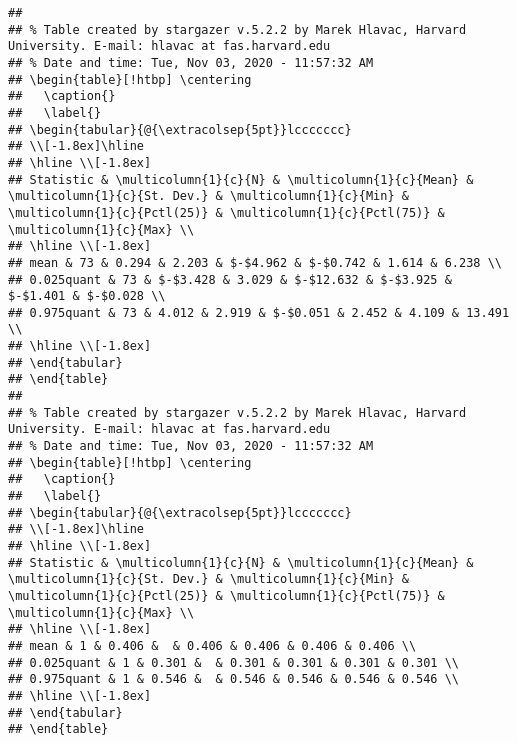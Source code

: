 \documentclass[
  12pt,
]{article}
\begin{document}
\begin{verbatim}
## 
## % Table created by stargazer v.5.2.2 by Marek Hlavac, Harvard University. E-mail: hlavac at fas.harvard.edu
## % Date and time: Tue, Nov 03, 2020 - 11:57:32 AM
## \begin{table}[!htbp] \centering 
##   \caption{} 
##   \label{} 
## \begin{tabular}{@{\extracolsep{5pt}}lccccccc} 
## \\[-1.8ex]\hline 
## \hline \\[-1.8ex] 
## Statistic & \multicolumn{1}{c}{N} & \multicolumn{1}{c}{Mean} & \multicolumn{1}{c}{St. Dev.} & \multicolumn{1}{c}{Min} & \multicolumn{1}{c}{Pctl(25)} & \multicolumn{1}{c}{Pctl(75)} & \multicolumn{1}{c}{Max} \\ 
## \hline \\[-1.8ex] 
## mean & 73 & 0.294 & 2.203 & $-$4.962 & $-$0.742 & 1.614 & 6.238 \\ 
## 0.025quant & 73 & $-$3.428 & 3.029 & $-$12.632 & $-$3.925 & $-$1.401 & $-$0.028 \\ 
## 0.975quant & 73 & 4.012 & 2.919 & $-$0.051 & 2.452 & 4.109 & 13.491 \\ 
## \hline \\[-1.8ex] 
## \end{tabular} 
## \end{table} 
## 
## % Table created by stargazer v.5.2.2 by Marek Hlavac, Harvard University. E-mail: hlavac at fas.harvard.edu
## % Date and time: Tue, Nov 03, 2020 - 11:57:32 AM
## \begin{table}[!htbp] \centering 
##   \caption{} 
##   \label{} 
## \begin{tabular}{@{\extracolsep{5pt}}lccccccc} 
## \\[-1.8ex]\hline 
## \hline \\[-1.8ex] 
## Statistic & \multicolumn{1}{c}{N} & \multicolumn{1}{c}{Mean} & \multicolumn{1}{c}{St. Dev.} & \multicolumn{1}{c}{Min} & \multicolumn{1}{c}{Pctl(25)} & \multicolumn{1}{c}{Pctl(75)} & \multicolumn{1}{c}{Max} \\ 
## \hline \\[-1.8ex] 
## mean & 1 & 0.406 &  & 0.406 & 0.406 & 0.406 & 0.406 \\ 
## 0.025quant & 1 & 0.301 &  & 0.301 & 0.301 & 0.301 & 0.301 \\ 
## 0.975quant & 1 & 0.546 &  & 0.546 & 0.546 & 0.546 & 0.546 \\ 
## \hline \\[-1.8ex] 
## \end{tabular} 
## \end{table}
\end{verbatim}
\end{document}
